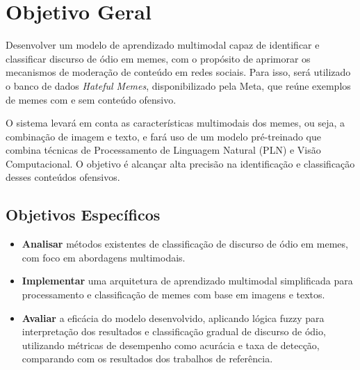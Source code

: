 \section{Objetivo Geral}

Desenvolver um modelo de aprendizado multimodal capaz de identificar e classificar discurso de ódio em memes, com o propósito de aprimorar os mecanismos de moderação de conteúdo em redes sociais. Para isso, será utilizado o banco de dados \textit{Hateful Memes}, disponibilizado pela Meta, que reúne exemplos de memes com e sem conteúdo ofensivo.

O sistema levará em conta as características multimodais dos memes, ou seja, a combinação de imagem e texto, e fará uso de um modelo pré-treinado que combina técnicas de Processamento de Linguagem Natural (PLN) e Visão Computacional. O objetivo é alcançar alta precisão na identificação e classificação desses conteúdos ofensivos.

\subsection{Objetivos Específicos}

\begin{itemize}
    \item \textbf{Analisar} métodos existentes de classificação de discurso de ódio em memes, com foco em abordagens multimodais.
    \item \textbf{Implementar} uma arquitetura de aprendizado multimodal simplificada para processamento e classificação de memes com base em imagens e textos.
    \item \textbf{Avaliar} a eficácia do modelo desenvolvido, aplicando lógica fuzzy para interpretação dos resultados e classificação gradual de discurso de ódio, utilizando métricas de desempenho como acurácia e taxa de detecção, comparando com os resultados dos trabalhos de referência.
\end{itemize}
